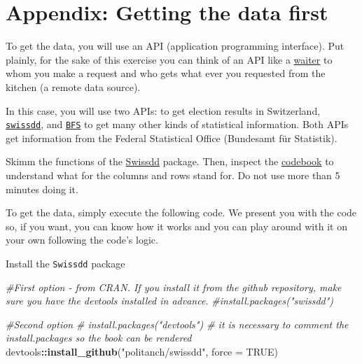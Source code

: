 \documentclass[
]{book}
\newenvironment{Shaded}{\begin{snugshade}}{\end{snugshade}}
\newcommand{\AttributeTok}[1]{\textcolor[rgb]{0.13,0.29,0.53}{#1}}
\newcommand{\CommentTok}[1]{\textcolor[rgb]{0.56,0.35,0.01}{\textit{#1}}}
\newcommand{\ConstantTok}[1]{\textcolor[rgb]{0.56,0.35,0.01}{#1}}
\newcommand{\FunctionTok}[1]{\textcolor[rgb]{0.13,0.29,0.53}{\textbf{#1}}}
\newcommand{\NormalTok}[1]{#1}
\newcommand{\SpecialCharTok}[1]{\textcolor[rgb]{0.81,0.36,0.00}{\textbf{#1}}}
\newcommand{\StringTok}[1]{\textcolor[rgb]{0.31,0.60,0.02}{#1}}
\begin{document}
\hypertarget{appendix-getting-the-data-first}{%
\section{Appendix: Getting the data first}\label{appendix-getting-the-data-first}}

To get the data, you will use an API (application programming interface). Put plainly, for the sake of this exercise you can think of an API like a \href{https://www.youtube.com/watch?v=s7wmiS2mSXY}{waiter} to whom you make a request and who gets what ever you requested from the kitchen (a remote data source).

In this case, you will use two APIs: to get election results in Switzerland, \href{https://politanch.github.io/swissdd/index.html}{\texttt{swissdd}}, and \href{https://github.com/lgnbhl/BFS}{\texttt{BFS}} to get many other kinds of statistical information. Both APIs get information from the Federal Statistical Office (Bundesamt für Statistik).

Skimm the functions of the \href{https://politanch.github.io/swissdd/reference/index.html}{Swissdd} package. Then, inspect the \href{https://swissvotes.ch/storage/b47562b197b7725fcfa45b3e5a4abad1b4cf14cd377136f87fd4473329a51114}{codebook} to understand what for the columns and rows stand for. Do not use more than 5 minutes doing it.

To get the data, simply execute the following code. We present you with the code so, if you want, you can know how it works and you can play around with it on your own following the code's logic.

Install the \texttt{Swissdd} package

\begin{Shaded}
\begin{Highlighting}[]
\CommentTok{\#First option  {-} from CRAN. If you install it from the github repository, make sure you have the \textasciigrave{}devtools\textasciigrave{} installed in advance.}
\CommentTok{\#install.packages("swissdd")}

\CommentTok{\#Second option}
\CommentTok{\# install.packages("devtools") \# it is necessary to comment the install.packages so the book can be rendered}
\NormalTok{devtools}\SpecialCharTok{::}\FunctionTok{install\_github}\NormalTok{(}\StringTok{"politanch/swissdd"}\NormalTok{, }\AttributeTok{force =} \ConstantTok{TRUE}\NormalTok{)}
\end{Highlighting}
\end{Shaded}
\end{document}
